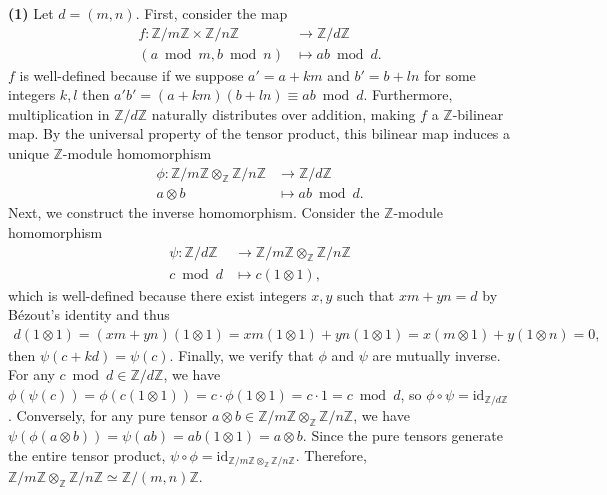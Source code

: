 \begin{solution}
    \textbf{(1)}
    Let $d = (m,n)$. First, consider the map
    \begin{align*}
        f: \mathbb{Z}/m\mathbb{Z} \times \mathbb{Z}/n\mathbb{Z} &\to \mathbb{Z}/d\mathbb{Z} \\
        (a\bmod m, b\bmod n) &\mapsto ab\bmod d.
    \end{align*}
    $f$ is well-defined because if we suppose $a' = a + km$ and $b' = b + ln$ for some integers $k, l$ then $a'b' = (a + km)(b + ln) \equiv ab \bmod d$. 
    Furthermore, multiplication in $\mathbb{Z}/d\mathbb{Z}$ naturally distributes over addition, making $f$ a $\mathbb{Z}$-bilinear map. 
    By the universal property of the tensor product, this bilinear map induces a unique $\mathbb{Z}$-module homomorphism
    \begin{align*}
        \phi: \mathbb{Z}/m\mathbb{Z} \otimes_{\mathbb{Z}} \mathbb{Z}/n\mathbb{Z} &\to \mathbb{Z}/d\mathbb{Z}\\
        a \otimes b &\mapsto ab \bmod d.
    \end{align*}
    Next, we construct the inverse homomorphism. 
    Consider the $\mathbb{Z}$-module homomorphism 
    \begin{align*}
        \psi:\mathbb{Z}/d\mathbb{Z} &\to \mathbb{Z}/m\mathbb{Z} \otimes_{\mathbb{Z}} \mathbb{Z}/n\mathbb{Z}\\
        c \bmod d&\mapsto c(1 \otimes 1),
    \end{align*}
    which is well-defined because there exist integers $x,y$ such that $xm+yn=d$ by Bézout's identity and thus
    \begin{align*}
        d(1 \otimes 1) = (xm + yn)(1 \otimes 1) = xm(1 \otimes 1) + yn(1 \otimes 1)= x(m \otimes 1) + y(1 \otimes n)=0,
    \end{align*}
    then $\psi(c+kd) = \psi(c)$.
    Finally, we verify that $\phi$ and $\psi$ are mutually inverse. For any $c \bmod d \in \mathbb{Z}/d\mathbb{Z}$, we have $\phi(\psi(c)) = \phi(c(1 \otimes 1)) = c \cdot \phi(1 \otimes 1) = c \cdot 1 = c \bmod d$,
     so $\phi \circ \psi = \text{id}_{\mathbb{Z}/d\mathbb{Z}}$. Conversely, for any pure tensor $a \otimes b \in \mathbb{Z}/m\mathbb{Z} \otimes_{\mathbb{Z}} \mathbb{Z}/n\mathbb{Z}$, we have $\psi(\phi(a \otimes b)) = \psi(ab) = ab(1 \otimes 1) = a \otimes b$. 
     Since the pure tensors generate the entire tensor product, $\psi \circ \phi = \text{id}_{\mathbb{Z}/m\mathbb{Z} \otimes_{\mathbb{Z}} \mathbb{Z}/n\mathbb{Z}}$. Therefore, $\mathbb{Z}/m\mathbb{Z} \otimes_{\mathbb{Z}} \mathbb{Z}/n\mathbb{Z} \simeq \mathbb{Z}/(m,n)\mathbb{Z}$.


\end{solution}
